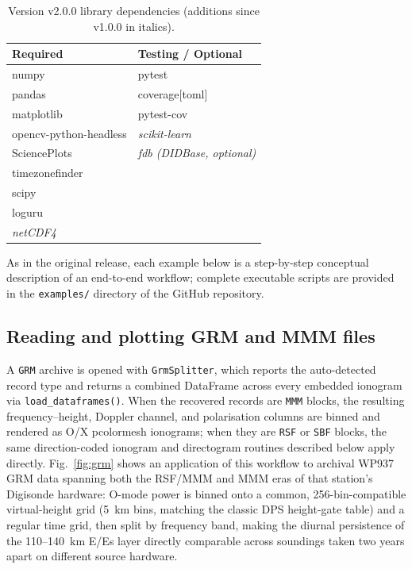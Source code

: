 \documentclass[12pt,a4paper]{article}
\begin{document}
\begin{table}[h!]
\caption{Version v2.0.0 library dependencies (additions since v1.0.0 in italics).}
\label{tab:deps}
\centering
\begin{tabular}{@{}ll@{}}
\toprule
\textbf{Required} & \textbf{Testing / Optional} \\
\midrule
numpy         & pytest \\
pandas        & coverage[toml] \\
matplotlib    & pytest-cov \\
opencv-python-headless & \emph{scikit-learn} \\
SciencePlots  & \emph{fdb (DIDBase, optional)} \\
timezonefinder & \\
scipy         & \\
loguru        & \\
\emph{netCDF4} & \\
\bottomrule
\end{tabular}
\end{table}

As in the original release, each example below is a step-by-step conceptual
description of an end-to-end workflow; complete executable scripts are
provided in the \texttt{examples/} directory of the GitHub repository.

\subsection{Reading and plotting GRM and MMM files}

A \texttt{GRM} archive is opened with \texttt{GrmSplitter}, which reports the
auto-detected record type and returns a combined DataFrame across every
embedded ionogram via \texttt{load\_dataframes()}. When the recovered
records are \texttt{MMM} blocks, the resulting frequency--height, Doppler
channel, and polarisation columns are binned and rendered as O/X pcolormesh
ionograms; when they are \texttt{RSF} or \texttt{SBF} blocks, the same
direction-coded ionogram and directogram routines described below apply
directly. Fig.~\ref{fig:grm} shows an application of this workflow to
archival WP937 GRM data spanning both the RSF/MMM and MMM eras of that
station's Digisonde hardware: O-mode power is binned onto a common,
256-bin-compatible virtual-height grid (5~km bins, matching the classic DPS
height-gate table) and a regular time grid, then split by frequency band,
making the diurnal persistence of the 110--140~km E/Es layer directly
comparable across soundings taken two years apart on different source
hardware.
\end{document}
